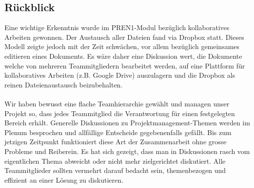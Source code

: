 \subsection{Rückblick}
Eine wichtige Erkenntnis wurde im PREN1-Modul bezüglich kollaboratives Arbeiten gewonnen. Der Austausch aller Dateien fand via Dropbox statt. Dieses Modell zeigte jedoch mit der Zeit schwächen, vor allem bezüglich gemeinsames editieren eines Dokuments. Es wäre daher eine Diskussion wert, die Dokumente welche von mehreren Teammitgliedern bearbeitet werden, auf eine Plattform für kollaboratives Arbeiten (z.B. Google Drive) auszulagern und die Dropbox als reinen Dateienaustausch beizubehalten.\\
\\
Wir haben bewusst eine flache Teamhierarchie gewählt und managen unser Projekt so, dass jedes Teammitglied die Verantwortung für einen festgelegten Bereich erhält. Generelle Diskussionen zu Projektmanagement-Themen werden im Plenum besprochen und allfällige Entscheide gegebenenfalls gefällt. Bis zum jetzigen Zeitpunkt funktioniert diese Art der Zusammenarbeit ohne grosse Probleme und Reiberein.
Es hat sich gezeigt, dass man in Diskussionen rasch vom eigentlichen Thema abweicht oder nicht mehr zielgerichtet diskutiert. Alle Teammitglieder sollten vermehrt darauf bedacht sein, themenbezogen und effizient an einer Lösung zu diskutieren.
